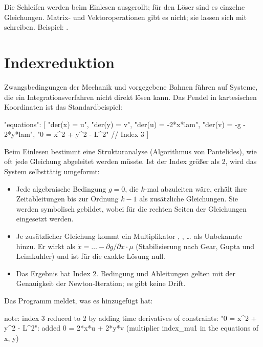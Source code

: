 Die Schleifen werden beim Einlesen ausgerollt; für den Löser sind es
einzelne Gleichungen. Matrix- und Vektoroperationen gibt es nicht; sie
lassen sich mit  schreiben. Beispiel:
.

\section{Indexreduktion}

Zwangsbedingungen der Mechanik und vorgegebene Bahnen führen auf Systeme,
die ein Integrationsverfahren nicht direkt lösen kann. Das Pendel in
kartesischen Koordinaten ist das Standardbeispiel:

\begin{json}
"equations": [
  "der(x) = u", "der(y) = v",
  "der(u) = -2*x*lam", "der(v) = -g - 2*y*lam",
  "0 = x^2 + y^2 - L^2"          // Index 3
]
\end{json}

Beim Einlesen bestimmt eine Strukturanalyse (Algorithmus von Pantelides),
wie oft jede Gleichung abgeleitet werden müsste. Ist der Index größer als
2, wird das System selbsttätig umgeformt:

\begin{itemize}
  \item Jede algebraische Bedingung $g = 0$, die $k$-mal abzuleiten wäre,
    erhält ihre Zeitableitungen bis zur Ordnung $k-1$ als zusätzliche
    Gleichungen. Sie werden symbolisch gebildet, wobei für 
    die rechten Seiten der Gleichungen  eingesetzt
    werden.
  \item Je zusätzlicher Gleichung kommt ein Multiplikator
    , , \dots{} als Unbekannte hinzu. Er
    wirkt als $\dot x = \dots - \partial g/\partial x \cdot \mu$
    (Stabilisierung nach Gear, Gupta und Leimkuhler) und ist für die exakte
    Lösung null.
  \item Das Ergebnis hat Index 2. Bedingung und Ableitungen gelten mit der
    Genauigkeit der Newton-Iteration; es gibt keine Drift.
\end{itemize}

Das Programm meldet, was es hinzugefügt hat:

\begin{shell}
note: index 3 reduced to 2 by adding time derivatives of constraints:
  "0 = x^2 + y^2 - L^2":
    added  0 = 2*x*u + 2*y*v   (multiplier index_mu1 in the equations of x, y)
\end{shell}

